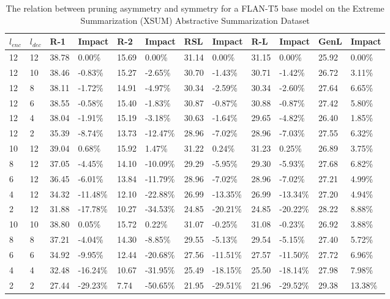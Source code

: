 \begin{table*}[!ht]
    \centering
    \caption{The relation between pruning asymmetry and symmetry for a FLAN-T5 base model on the Extreme Summarization (XSUM) Abstractive Summarization Dataset}
    \small
    \begin{tabular}{|l|l|l|l|l|l|l|l|l|l|l|l|}
    \hline
        $l_{enc}$ & $l_{dec}$ & R-1 & Impact & R-2 & Impact & RSL & Impact & R-L & Impact & GenL & Impact \\ \hline
        12 & 12 & 38.78 & 0.00\% & 15.69 & 0.00\% & 31.14 & 0.00\% & 31.15 & 0.00\% & 25.92 & 0.00\% \\ \hline
        12 & 10 & 38.46 & -0.83\% & 15.27 & -2.65\% & 30.70 & -1.43\% & 30.71 & -1.42\% & 26.72 & 3.11\% \\ \hline
        12 & 8 & 38.11 & -1.72\% & 14.91 & -4.97\% & 30.34 & -2.59\% & 30.34 & -2.60\% & 27.64 & 6.65\% \\ \hline
        12 & 6 & 38.55 & -0.58\% & 15.40 & -1.83\% & 30.87 & -0.87\% & 30.88 & -0.87\% & 27.42 & 5.80\% \\ \hline
        12 & 4 & 38.04 & -1.91\% & 15.19 & -3.18\% & 30.63 & -1.64\% & 29.65 & -4.82\% & 26.40 & 1.85\% \\ \hline
        12 & 2 & 35.39 & -8.74\% & 13.73 & -12.47\% & 28.96 & -7.02\% & 28.96 & -7.03\% & 27.55 & 6.32\% \\ \hline
        10 & 12 & 39.04 & 0.68\% & 15.92 & 1.47\% & 31.22 & 0.24\% & 31.23 & 0.25\% & 26.89 & 3.75\% \\ \hline
        8 & 12 & 37.05 & -4.45\% & 14.10 & -10.09\% & 29.29 & -5.95\% & 29.30 & -5.93\% & 27.68 & 6.82\% \\ \hline
        6 & 12 & 36.45 & -6.01\% & 13.84 & -11.79\% & 28.96 & -7.02\% & 28.96 & -7.02\% & 27.21 & 4.99\% \\ \hline
        4 & 12 & 34.32 & -11.48\% & 12.10 & -22.88\% & 26.99 & -13.35\% & 26.99 & -13.34\% & 27.20 & 4.94\% \\ \hline
        2 & 12 & 31.88 & -17.78\% & 10.27 & -34.53\% & 24.85 & -20.21\% & 24.85 & -20.22\% & 28.22 & 8.88\% \\ \hline
        10 & 10 & 38.80 & 0.05\% & 15.72 & 0.22\% & 31.07 & -0.25\% & 31.08 & -0.23\% & 26.92 & 3.88\% \\ \hline
        8 & 8 & 37.21 & -4.04\% & 14.30 & -8.85\% & 29.55 & -5.13\% & 29.54 & -5.15\% & 27.40 & 5.72\% \\ \hline
        6 & 6 & 34.92 & -9.95\% & 12.44 & -20.68\% & 27.56 & -11.51\% & 27.57 & -11.50\% & 27.72 & 6.96\% \\ \hline
        4 & 4 & 32.48 & -16.24\% & 10.67 & -31.95\% & 25.49 & -18.15\% & 25.50 & -18.14\% & 27.98 & 7.98\% \\ \hline
        2 & 2 & 27.44 & -29.23\% & 7.74 & -50.65\% & 21.95 & -29.51\% & 21.96 & -29.52\% & 29.38 & 13.38\% \\ \hline
    \end{tabular}
    \label{tab:asym-base-xsum}
\end{table*}

